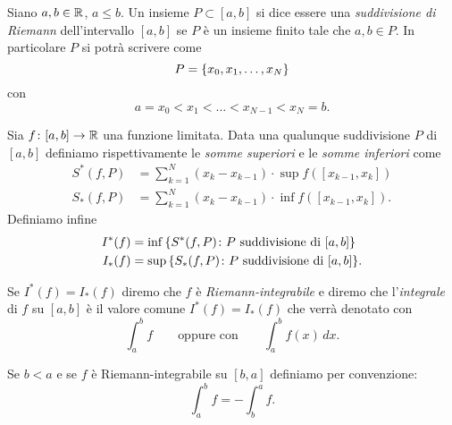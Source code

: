 \begin{definition}%
\label{def:integrale}%
\mymark{***}%
%
%
%
Siano $a,b\in {\mathbb R}$, $a \le b$.
Un insieme $P\subset [a,b]$ si dice essere una \emph{suddivisione di Riemann}%
%
dell'intervallo $[a,b]$ se $P$ è un insieme finito tale che $a,b\in P$.
In particolare $P$ si
potrà scrivere come
\[
 P = {\left\{  x_0, x_1, \dots, x_N \right\}}
\]
con
\[
  a = x_0 < x_1 < \dots < x_{N-1} < x_N = b.
\]

Sia $f\colon [a,b] \to {\mathbb R}$ una funzione limitata.
Data una qualunque suddivisione $P$ di $[a,b]$ definiamo
rispettivamente le \emph{somme superiori} e le \emph{somme inferiori}
%
come
\begin{align*}
S^*(f,P)
&= \sum_{k=1}^N (x_k - x_{k-1}) \cdot \sup f([x_{k-1},x_k]) \\
S_*(f,P)
&= \sum_{k=1}^N (x_k - x_{k-1}) \cdot \inf f([x_{k-1},x_k]).
\end{align*}
Definiamo infine
\begin{align*}
  I^*(f) &= \inf {\left\{ S^*(f,P) \colon \text{$P$ suddivisione di $[a,b]$} \right\}}
  \\
  I_*(f) &= \sup {\left\{ S_*(f,P) \colon \text{$P$ suddivisione di $[a,b]$} \right\}}.
\end{align*}

Se $I^*(f) = I_*(f)$ diremo che $f$ è
\emph{Riemann-integrabile}
%
%
%
%
%
%
e diremo che l'\emph{integrale} di $f$ su $[a,b]$ è
il valore comune $I^*(f)=I_*(f)$ che verrà denotato con
\[
  \int_a^b f
  \qquad{\text{oppure con}} \qquad
  \int_a^b f(x)\, dx.
\]

Se $b<a$ e se $f$ è Riemann-integrabile su $[b,a]$
definiamo per convenzione:
\[
  \int_a^b f = -\int_b^a f.
\]
\end{definition}

